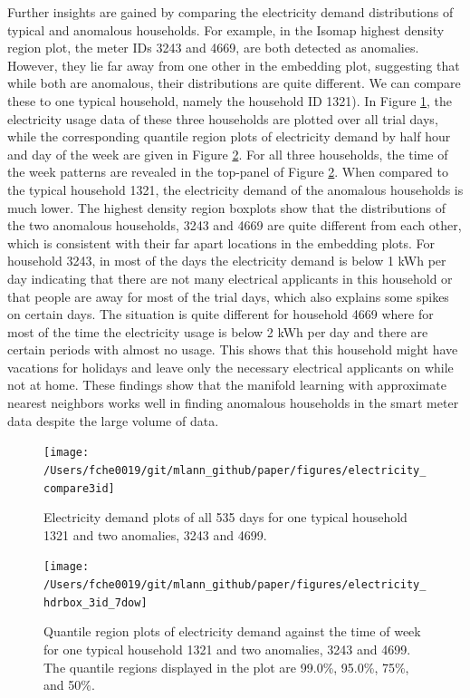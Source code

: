 \documentclass[11pt,a4paper,]{article}
\begin{document}
Further insights are gained by comparing the electricity demand distributions of typical and anomalous households. For example, in the Isomap highest density region plot, the meter IDs 3243 and 4669, are both detected as anomalies. However, they lie far away from one other in the embedding plot, suggesting that while both are anomalous, their distributions are quite different. We can compare these to one typical household, namely the household ID 1321). In Figure \ref{fig:compare3ids}, the electricity usage data of these three households are plotted over all trial days, while the corresponding quantile region plots of electricity demand by half hour and day of the week are given in Figure \ref{fig:hdrboxplot3ids}. For all three households, the time of the week patterns are revealed in the top-panel of Figure \ref{fig:hdrboxplot3ids}. When compared to the typical household 1321, the electricity demand of the anomalous households is much lower. The highest density region boxplots show that the distributions of the two anomalous households, 3243 and 4669 are quite different from each other, which is consistent with their far apart locations in the embedding plots. For household 3243, in most of the days the electricity demand is below 1 kWh per day indicating that there are not many electrical applicants in this household or that people are away for most of the trial days, which also explains some spikes on certain days. The situation is quite different for household 4669 where for most of the time the electricity usage is below 2 kWh per day and there are certain periods with almost no usage. This shows that this household might have vacations for holidays and leave only the necessary electrical applicants on while not at home. These findings show that the manifold learning with approximate nearest neighbors works well in finding anomalous households in the smart meter data despite the large volume of data.

\begin{figure}

{\centering \texttt{[image: /Users/fche0019/git/mlann\_github/paper/figures/electricity\_compare3id]} 

}

\caption{Electricity demand plots of all 535 days for one typical household 1321 and two anomalies, 3243 and 4699. }\label{fig:compare3ids}
\end{figure}
\begin{figure}

{\centering \texttt{[image: /Users/fche0019/git/mlann\_github/paper/figures/electricity\_hdrbox\_3id\_7dow]} 

}

\caption{Quantile region plots of electricity demand against the time of week for one typical household 1321 and two anomalies, 3243 and 4699. The quantile regions displayed in the plot are 99.0\%, 95.0\%, 75\%, and 50\%. }\label{fig:hdrboxplot3ids}
\end{figure}
\end{document}
